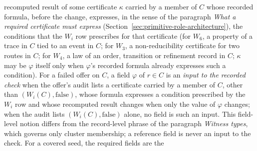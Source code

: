 recomputed result of some certificate \(\kappa\) carried by a member of \(C\)
whose recorded formula, before the change, expresses, in the sense of the paragraph \emph{What a required certificate must
express} (Section~\ref{sec:primitive-role-architecture}), the
conditions that the \(W_i\) row prescribes
for that certificate (for
\(W_6\), a property of a trace in \(C\) tied to an event in \(C\); for \(W_3\), a
non-reducibility certificate for two routes in \(C\); for \(W_4\), a law of an
order, transition or refinement record in \(C\); \(\kappa\) may be \(\varphi\)
itself only when \(\varphi\)'s recorded formula already expresses such a
condition). For a failed offer on \(C\), a
field \(\varphi\) of \(r\in C\) is an \emph{input to the recorded check} when the
offer's audit lists a certificate carried by a member of \(C\), other than
\((W_i(C),\mathrm{false})\), whose formula expresses a condition prescribed by
the \(W_i\) row and whose recomputed result changes when only the value of
\(\varphi\) changes; when the audit lists \((W_i(C),\mathrm{false})\) alone, no
field is such an input. This field-level notion differs from the record-level
phrase of the paragraph \emph{Witness types}, which governs only cluster
membership; a reference field is never an input to the check. For a covered seed, the required fields are the
